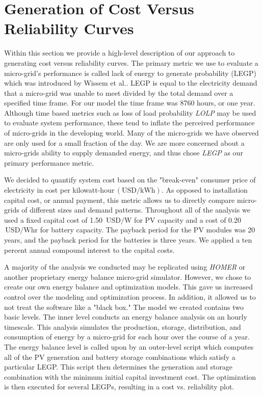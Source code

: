 \documentclass{article}
\newcommand{\unit}[1]{\ensuremath{\, \mathrm{#1}}}
\begin{document}
\section{Generation of Cost Versus Reliability Curves}
Within this section we provide a high-level description of our approach to generating cost versus reliability curves.
The primary metric we use to evaluate a micro-grid's performance is called lack of energy to generate probability (LEGP) which was introduced by Wissem et al.\cite{}.
LEGP is equal to the electricity demand that a micro-grid was unable to meet divided by the total demand over a specified time frame.
For our model the time frame was 8760 hours, or one year.
Although time based metrics such as loss of load probability \emph{LOLP} may be used to evaluate system performance, these tend to inflate the perceived performance of micro-grids in the developing world.
Many of the micro-grids we have observed are only used for a small fraction of the day.
We are more concerned about a micro-grids ability to supply demanded energy, and thus chose \emph{LEGP} as our primary performance metric.

We decided to quantify system cost based on the "break-even" consumer price of electricity in cost per kilowatt-hour\unit{(USD/kWh)}.
As opposed to installation capital cost, or annual payment, this metric allows us to directly compare micro-grids of different sizes and demand patterns.
Throughout all of the analysis we used a fixed capital cost of 1.50 \unit{USD/W} for PV capacity and a cost of 0.20 \unit{USD/Whr} for battery capacity.
The payback period for the PV modules was 20 years, and the payback period for the batteries is three years. 
We applied a ten percent annual compound interest to the capital costs.

A majority of the analysis we conducted may be replicated using \emph{HOMER} or another proprietary energy balance micro-grid simulator.
However, we chose to create our own energy balance and optimization models.
This gave us increased control over the modeling and optimization process.
In addition, it allowed us to not treat the software like a "black box."
The model we created contains two basic levels.
The inner level conducts an energy balance analysis on an hourly timescale.
This analysis simulates the production, storage, distribution, and consumption of energy by a micro-grid for each hour over the course of a year.
The energy balance level is called upon by an outer-level script which computes all of the PV generation and battery storage combinations which satisfy a particular LEGP.
This script then determines the generation and storage combination with the minimum initial capital investment cost.
The optimization is then executed for several LEGPs, resulting in a cost vs. reliability plot.
\end{document}
